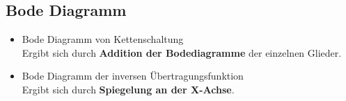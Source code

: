 \subsection{Bode Diagramm}
\begin{itemize}
    \item Bode Diagramm von Kettenschaltung\\
        Ergibt sich durch \textbf{Addition der Bodediagramme} der einzelnen Glieder.
    \item Bode Diagramm der inversen Übertragungsfunktion\\
        Ergibt sich durch \textbf{Spiegelung an der X-Achse}.
\end{itemize}
